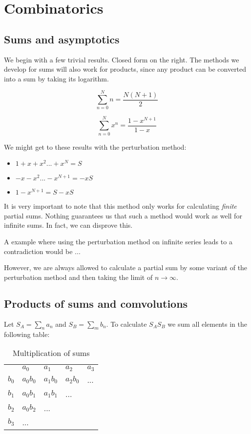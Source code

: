 \section{Combinatorics}

\subsection{Sums and asymptotics}

We begin with a few trivial results. Closed form on the right. The methods we develop for sums will also work for products, since any product can be converted into a sum by taking its logarithm.

$$ \sum_{n=0}^N n = \frac{N(N+1)}{2} $$

$$ \sum_{n=0}^N x^n = \frac{1-x^{N+1}}{1-x} $$

We might get to these results with the perturbation method:

\begin{itemize}
    \item $ 1 + x + x^2 ... + x^N = S $
    \item $ -x -x^2 ... -x^{N+1} = -xS $
    \item $ 1 - x^{N+1} = S -xS $
\end{itemize}

It is very important to note that this method only works for calculating \textit{finite} partial sums. Nothing guarantees us that such a method would work as well for infinite sums. In fact, we can disprove this.

\begin{theorem}
    A example where using the perturbation method on infinite series leads to a contradiction would be ...
\end{theorem}


However, we are always allowed to calculate a partial sum by some variant of the perturbation method and then taking the limit of $n \to \infty$.

\subsection{Products of sums and comvolutions}

Let $S_A = \sum_n a_n$ and $S_B = \sum_m b_n$. To calculate $S_A S_B$ we sum all elements in the following table: 

\begin{table}[H]
\centering
\caption{Multiplication of sums}
\begin{tabular}{lllll}
     & $a_0$      & $a_1$      & $a_2$      & $a_3$ \\
$b_0$ & $a_0 b_0$ & $a_1 b_0$ & $a_2 b_0$ & ...  \\
$b_1$ & $a_0 b_1$ & $a_1 b_1$ & ...       &      \\
$b_2$ & $a_0 b_2$ & ...       &           &      \\
$b_3$ & ...       &           &           &     
\end{tabular}
\end{table}

